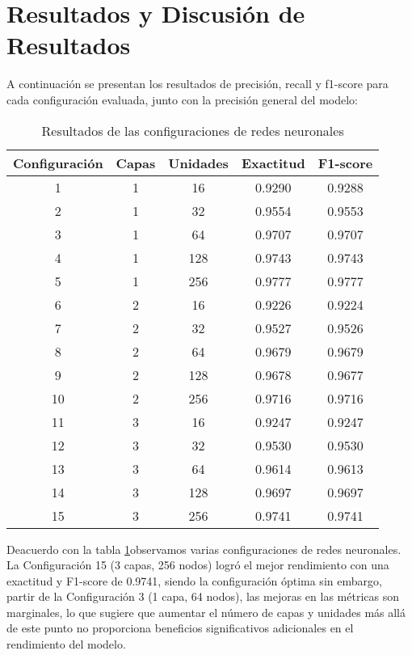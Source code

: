 \documentclass[a4paper,12pt]{article}
\begin{document}
\section{Resultados y Discusión de Resultados}

A continuación se presentan los resultados de precisión, recall y f1-score para cada configuración evaluada, junto con la precisión general del modelo:

\begin{table}[h]
\centering
\begin{tabular}{|c|c|c|c|c|}
\hline
Configuración & Capas & Unidades & Exactitud & F1-score \\ \hline
1             & 1     & 16       & 0.9290    & 0.9288   \\ \hline
2             & 1     & 32       & 0.9554    & 0.9553   \\ \hline
3             & 1     & 64       & 0.9707    & 0.9707   \\ \hline
4             & 1     & 128      & 0.9743    & 0.9743   \\ \hline
5             & 1     & 256      & 0.9777    & 0.9777   \\ \hline
6             & 2     & 16       & 0.9226    & 0.9224   \\ \hline
7             & 2     & 32       & 0.9527    & 0.9526   \\ \hline
8             & 2     & 64       & 0.9679    & 0.9679   \\ \hline
9             & 2     & 128      & 0.9678    & 0.9677   \\ \hline
10            & 2     & 256      & 0.9716    & 0.9716   \\ \hline
11            & 3     & 16       & 0.9247    & 0.9247   \\ \hline
12            & 3     & 32       & 0.9530    & 0.9530   \\ \hline
13            & 3     & 64       & 0.9614    & 0.9613   \\ \hline
14            & 3     & 128      & 0.9697    & 0.9697   \\ \hline
15            & 3     & 256      & 0.9741    & 0.9741   \\ \hline
\end{tabular}
\caption{Resultados de las configuraciones de redes neuronales}
\label{tabla:resultados}
\end{table}

Deacuerdo con la tabla \ref{tabla:resultados}observamos varias configuraciones de redes neuronales. La Configuración 15 (3 capas, 256 nodos) logró el mejor rendimiento con una exactitud y F1-score de 0.9741, siendo la configuración óptima sin embargo,  partir de la Configuración 3 (1 capa, 64 nodos), las mejoras en las métricas son marginales, lo que sugiere que aumentar el número de capas y unidades más allá de este punto no proporciona beneficios significativos adicionales en el rendimiento del modelo.
\end{document}
